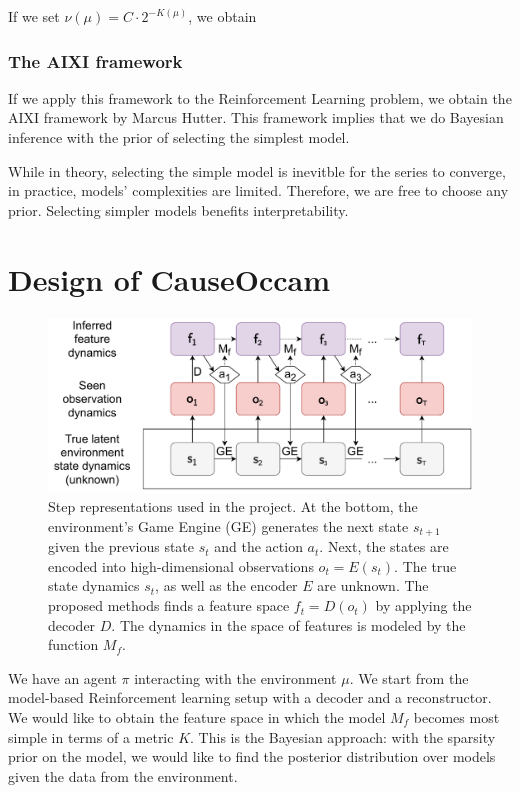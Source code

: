 \documentclass[a4paper,11pt,oneside]{report}
\newcommand{\sysname}{CauseOccam\xspace}
\begin{document}
If we set $\nu(\mu)=C\cdot2^{-K(\mu)}$, we obtain

\subsection{The AIXI framework}
\label{subsec:aixi}
If we apply this framework to the Reinforcement Learning problem, we obtain the AIXI framework by Marcus Hutter. This framework implies that we do Bayesian inference with the prior of selecting the simplest model.

While in theory, selecting the simple model is inevitble for the series to converge, in practice, models' complexities are limited. Therefore, we are free to choose any prior. Selecting simpler models benefits interpretability.


\chapter{Design of \sysname}
\label{ch:design}
\begin{figure}[h]
    \centering
    \includegraphics[width=0.7\linewidth]{diagrams/step_spaces}
    \caption{Step representations used in the project. At the bottom, the environment's Game Engine (GE) generates the next state $s_{t+1}$ given the previous state $s_t$ and the action $a_t$. Next, the states are encoded into high-dimensional observations $o_t=E(s_t)$. The true state dynamics $s_t$, as well as the encoder $E$ are unknown. The proposed methods finds a feature space $f_t=D(o_t)$ by applying the decoder $D$. The dynamics in the space of features is modeled by the function $M_f$.}
    \label{fig:step_spaces}
\end{figure}


We have an agent $\pi$ interacting with the environment $\mu$. We start from the model-based Reinforcement learning setup with a decoder and a reconstructor. We would like to obtain the feature space in which the model $M_f$ becomes most simple in terms of a metric $K$. This is the Bayesian approach: with the sparsity prior on the model, we would like to find the posterior distribution over models given the data from the environment.
\end{document}
